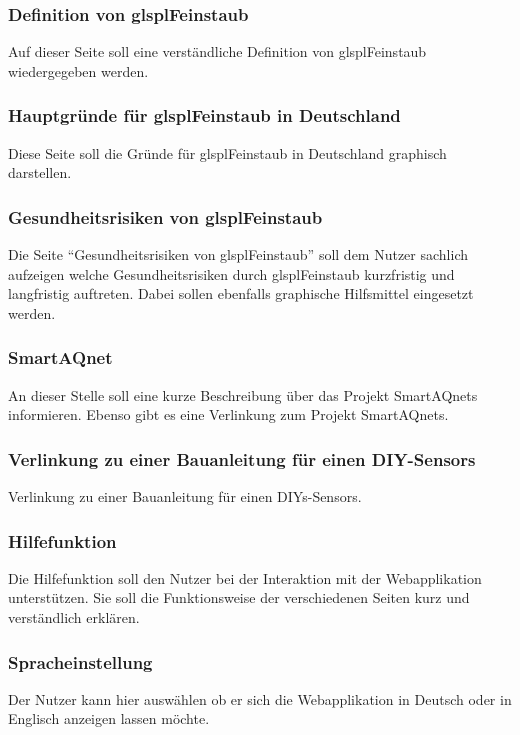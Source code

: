 \subsubsection{Definition von glspl{Feinstaub}}
Auf dieser Seite soll eine verständliche Definition von glspl{Feinstaub} wiedergegeben werden.


\subsubsection{Hauptgründe für glspl{Feinstaub} in Deutschland}
Diese Seite soll die Gründe für glspl{Feinstaub} in Deutschland graphisch darstellen.


\subsubsection{Gesundheitsrisiken von glspl{Feinstaub}}
Die Seite \enquote{Gesundheitsrisiken von glspl{Feinstaub}} soll dem Nutzer sachlich aufzeigen welche Gesundheitsrisiken durch glspl{Feinstaub} kurzfristig und langfristig auftreten. 
Dabei sollen ebenfalls graphische Hilfsmittel eingesetzt werden.

\subsubsection{SmartAQnet}
An dieser Stelle soll eine kurze Beschreibung über das Projekt \glspl{SmartAQnet} informieren. 
Ebenso gibt es eine Verlinkung zum Projekt \glspl{SmartAQnet}.

\subsubsection{Verlinkung zu einer Bauanleitung für einen \glspl{DIY-Sensor}}
Verlinkung zu einer Bauanleitung für einen \glspl{DIY}-\glspl{Sensor}.

\subsubsection{Hilfefunktion}
Die Hilfefunktion soll den Nutzer bei der Interaktion mit der Webapplikation unterstützen. Sie soll die Funktionsweise der verschiedenen Seiten kurz und verständlich erklären.

\subsubsection{Spracheinstellung}
Der Nutzer kann hier auswählen ob er sich die Webapplikation in Deutsch oder in Englisch anzeigen lassen möchte.

